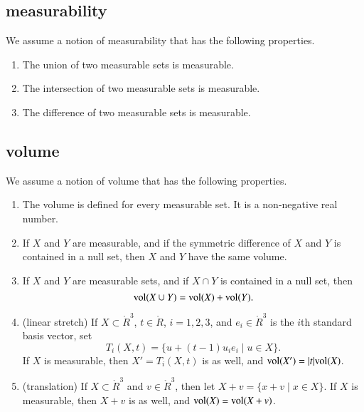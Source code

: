 \subsection{measurability}\label{sec:measure}

We assume a notion of measurability that has the following properties.

\begin{enumerate}%
 \item The union of two measurable sets is measurable.\\
 \item The intersection of two measurable sets is measurable.\\
 \item The difference of two measurable sets is measurable.
\end{enumerate}

\subsection{volume}\label{sec:volume}

We assume a notion of volume that has the following properties.

\begin{enumerate}%
 \item The volume is defined for every measurable set.  It is
    a non-negative real number.
 \item If $X$ and $Y$ are  measurable, and if
 the symmetric difference of
 $X$ and $Y$ is contained in a null set, then 
    $X$ and $Y$ have the same volume.\\
 \item If $X$ and $Y$ are measurable sets, and if $X\cap
 Y$ is contained in a null set, then
    $$
    {\operatorname{vol}}(X\cup Y) = {\operatorname{vol}}(X) + {\operatorname{vol}}(Y).
    $$
  \item (linear stretch) If $X\subset \ring{R}^3$, $t\in\ring{R}$, 
    $i=1,2,3$, and $e_i\in\ring{R}^3$ is the $i$th standard basis vector,
    set 
      $$T_i(X,t) = \{ u + (t-1) u_i e_i \mid u\in X\}.
      $$
    If $X$ is measurable, then $X'=T_i(X,t)$ is as well,
    and ${\operatorname{vol}}(X') = |t|{\operatorname{vol}}(X)$.
  \item (translation) If $X\subset \ring{R}^3$ and $v\in\ring{R}^3$, then let
    $X+v = \{x + v\mid x\in X\}$.  If $X$ is measurable, then $X+v$ is
    as well, and ${\operatorname{vol}}(X) = {\operatorname{vol}}(X+v)$.
\end{enumerate}

